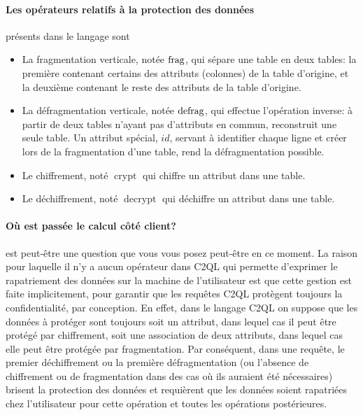 \paragraph{Les opérateurs relatifs à la protection des données}
présents dans le langage sont
\begin{itemize}
	\item La fragmentation verticale, notée $\operatorname{frag}$,
	qui sépare une table en deux tables: la première contenant certains
	des attributs (colonnes) de la table d'origine, et la deuxième contenant
	le reste des attributs de la table d'origine.
	
	\item La défragmentation verticale, notée $\operatorname{defrag}$,
	qui effectue l'opération inverse: à partir de deux
	tables n'ayant pas d'attributs en commun, reconstruit une seule table.
	Un attribut spécial, $id$, servant à identifier chaque ligne et créer lors de 
	la fragmentation d'une table, rend la défragmentation possible.
	
	\item Le chiffrement, noté $\operatorname{crypt}$
	qui chiffre un attribut dans une table.
	
	\item Le déchiffrement, noté $\operatorname{decrypt}$
	qui déchiffre un attribut dans une table.
\end{itemize}

\paragraph{\og Où est passée le calcul côté client?\fg{}}
est peut-être une question que vous vous posez peut-être en ce moment.
La raison pour laquelle il n'y a aucun opérateur dans C2QL 
qui permette d'exprimer le rapatriement des données sur la machine de l'utilisateur
est que cette gestion est faite implicitement, pour garantir
que les requêtes C2QL protègent toujours la confidentialité, par conception.
En effet, dans le langage C2QL on suppose que les données à protéger sont toujours
soit un attribut, dans lequel cas il peut être protégé par chiffrement,
soit une association de deux attributs, dans lequel cas elle peut être protégée
par fragmentation. Par conséquent, dans une requête, le premier déchiffrement 
ou la première défragmentation (ou l'absence de chiffrement ou de
fragmentation dans des cas où ils auraient été nécessaires)
brisent la protection des données et requièrent que
les données soient rapatriées chez l'utilisateur pour cette opération et toutes
les opérations postérieures.

